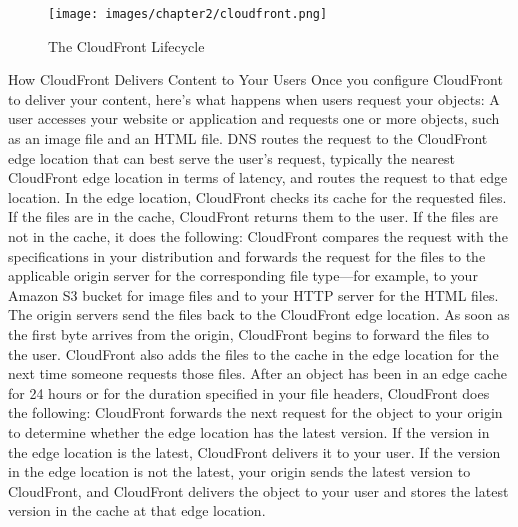 \begin{figure}[htb] %
 \centering
 \texttt{[image: images/chapter2/cloudfront.png]}\hfill
 \caption[The CloudFront Lifecycle]{The CloudFront Lifecycle}
 \label{fig:fourV}
\end{figure}



How CloudFront Delivers Content to Your Users
Once you configure CloudFront to deliver your content, here's what happens when users request your objects:
A user accesses your website or application and requests one or more objects, such as an image file and an HTML file.
DNS routes the request to the CloudFront edge location that can best serve the user's request, typically the nearest CloudFront edge location in terms of latency, and routes the request to that edge location.
In the edge location, CloudFront checks its cache for the requested files. If the files are in the cache, CloudFront returns them to the user. If the files are not in the cache, it does the following:
CloudFront compares the request with the specifications in your distribution and forwards the request for the files to the applicable origin server for the corresponding file type—for example, to your Amazon S3 bucket for image files and to your HTTP server for the HTML files.
The origin servers send the files back to the CloudFront edge location.
As soon as the first byte arrives from the origin, CloudFront begins to forward the files to the user. CloudFront also adds the files to the cache in the edge location for the next time someone requests those files.
After an object has been in an edge cache for 24 hours or for the duration specified in your file headers, CloudFront does the following:
CloudFront forwards the next request for the object to your origin to determine whether the edge location has the latest version.
If the version in the edge location is the latest, CloudFront delivers it to your user.
If the version in the edge location is not the latest, your origin sends the latest version to CloudFront, and CloudFront delivers the object to your user and stores the latest version in the cache at that edge location.